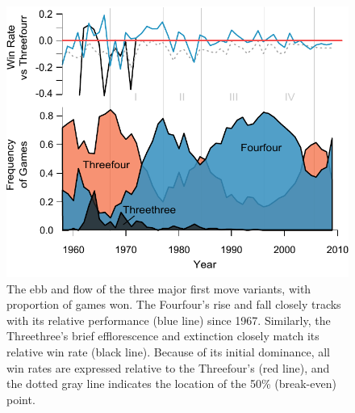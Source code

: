  \begin{figure}[t]
\begin{center} 
\includegraphics[scale=1.0]{figures/gofirstmove/figM1FreqsWins.pdf}
\caption{The ebb and flow of the three major first move variants, with proportion of games won.  The Fourfour's rise and fall closely tracks with its relative performance (blue line) since 1967.  Similarly, the Threethree's brief efflorescence and extinction closely match its relative win rate (black line).  Because of its initial dominance, all win rates are expressed relative to the Threefour's (red line), and the dotted gray line indicates the location of the 50\% (break-even) point.}
\label{fig:M1FreqsWins}
\end{center}
\end{figure}
 
